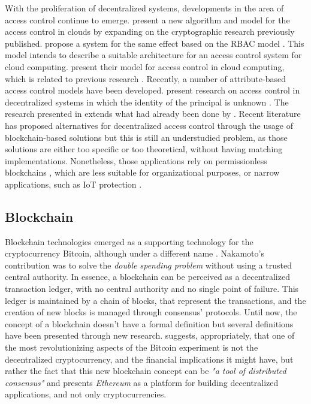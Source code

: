 With the proliferation of decentralized systems, developments in the area of access control continue
to emerge. \cite{ruj_dacc:_2011} present a new algorithm and model for the access control \cite{ruj_dacc:_2011} in clouds by expanding on the cryptographic research previously published. \cite{calero_toward_2010} propose a system for the same effect based on the RBAC model \cite{calero_toward_2010}. This model intends to describe a suitable architecture for an access control system for cloud computing. \cite{yu_achieving_2010} present their model for access control in cloud computing, which is related to previous research \cite{calero_toward_2010}. Recently, a number of attribute-based access control models have been developed. \cite{ruj_decentralized_2014} present research on access control in decentralized systems in which the identity of the principal is unknown \cite{ruj_decentralized_2014}. The research presented in \cite{ruj_decentralized_2014} extends what had already been done by \cite{ruj_privacy_2012}. Recent literature has proposed alternatives for decentralized access control through the usage of blockchain-based solutions but this is still an understudied problem, as those solutions are either too specific or too theoretical, without having matching implementations. Nonetheless, those applications rely on permissionless blockchains \cite{maesa_blockchain_2017}, which are less suitable for organizational purposes, or narrow applications, such as IoT protection \cite{ouaddah_fairaccess:_2017}.

\subsection{Blockchain}
\label{sec:related-blockchain}

Blockchain technologies emerged as a supporting technology for the cryptocurrency Bitcoin, although under a different name \cite{nakamoto_bitcoin:_2008}. Nakamoto's contribution was to solve the \textit{double spending problem} without using a trusted central authority. In essence, a blockchain can be perceived as a decentralized transaction ledger, with no central authority and no single point of failure. This ledger is maintained by a chain of blocks, that represent the transactions, and the creation of new blocks is managed through consensus' protocols. Until now, the concept of a blockchain doesn't have a formal definition but several definitions have been presented through new research. \cite{buterin_next-generation_2013} suggests, appropriately, that one of the most revolutionizing aspects of the Bitcoin experiment is not the decentralized cryptocurrency, and the financial implications it might have, but rather the fact that this new blockchain concept can be \textit{"a tool of distributed consensus"} \cite{buterin_next-generation_2013} and presents \textit{Ethereum} as a platform for building decentralized applications, and not only cryptocurrencies.

